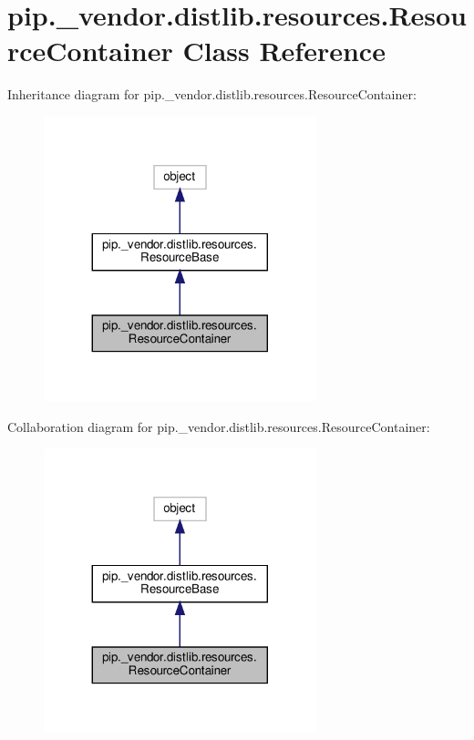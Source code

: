 \hypertarget{classpip_1_1__vendor_1_1distlib_1_1resources_1_1ResourceContainer}{}\section{pip.\+\_\+vendor.\+distlib.\+resources.\+Resource\+Container Class Reference}
\label{classpip_1_1__vendor_1_1distlib_1_1resources_1_1ResourceContainer}


Inheritance diagram for pip.\+\_\+vendor.\+distlib.\+resources.\+Resource\+Container\+:
\nopagebreak
\begin{figure}[H]
\begin{center}
\leavevmode
\includegraphics[width=224pt]{classpip_1_1__vendor_1_1distlib_1_1resources_1_1ResourceContainer__inherit__graph}
\end{center}
\end{figure}


Collaboration diagram for pip.\+\_\+vendor.\+distlib.\+resources.\+Resource\+Container\+:
\nopagebreak
\begin{figure}[H]
\begin{center}
\leavevmode
\includegraphics[width=224pt]{classpip_1_1__vendor_1_1distlib_1_1resources_1_1ResourceContainer__coll__graph}
\end{center}
\end{figure}

